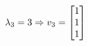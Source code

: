 \documentclass[preview]{standalone}
\begin{document}
\begin{align*}
\special{dvisvgm:raw <g id='unique000'>}\lambda_3 = 3 \Rightarrow v_3 = \begin{bmatrix} 1 \\ 1 \\ 1 \end{bmatrix}\special{dvisvgm:raw </g>}
\end{align*}
\end{document}
